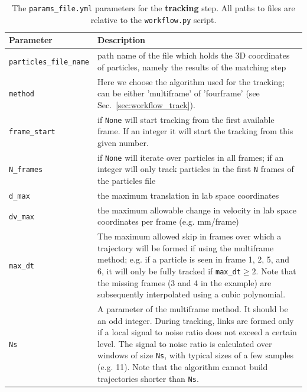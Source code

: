 \documentclass[10pt,a4paper]{article}
\begin{document}
\begin{table}[!ht]
	\centering
	\caption{The \texttt{params\_file.yml} parameters for the \textbf{tracking} step. All paths to files are relative to the \texttt{workflow.py} script.}
	\label{tab:tracking_params}
	\begin{tabular}{l m{12cm}}
		\hline
		Parameter & Description\\
		\hline
		
		\texttt{particles\_file\_name} & path name of the file which holds the 3D coordinates of particles, namely the results of the matching step  \\[.2cm]
		
		\texttt{method} & Here we choose the algorithm used for the tracking; can be either 'multiframe' of 'fourframe' (see Sec.~\ref{sec:workflow_track}). \\[.2cm]
		
		\texttt{frame\_start} & if \texttt{None} will start tracking from the first available frame. If an integer it will start the tracking from this given number. \\[.2cm]
		
		\texttt{N\_frames} & if \texttt{None} will iterate over particles in all frames; if an integer will only track particles in the first \texttt{N} frames of the particles file\\[.2cm]
		
		\texttt{d\_max} & the maximum translation in lab space coordinates \\[.2cm]
		
		\texttt{dv\_max} & the maximum allowable change in velocity in lab space coordinates per frame (e.g. mm/frame) \\[.2cm]
		
		\texttt{max\_dt} & The maximum allowed skip in frames over which a trajectory will be formed if using the multiframe method; e.g. if a particle is seen in frame 1, 2, 5, and 6, it will only be fully tracked if \texttt{max\_dt}$\geq 2$. Note that the missing frames (3 and 4 in the example) are subsequently interpolated using a cubic polynomial. \\[.2cm]
		
		\texttt{Ns} & A parameter of the multiframe method. It should be an odd integer. During tracking, links are formed only if a local signal to noise ratio does not exceed a certain level. The signal to noise ratio is calculated over windows of size \texttt{Ns}, with typical sizes of a few samples (e.g. 11). Note that the algorithm cannot build trajectories shorter than \texttt{Ns}.\\[.2cm]
		

\end{tabular}
\end{table}
\end{document}

